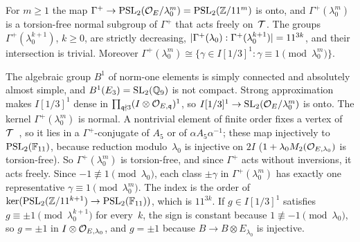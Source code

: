 \begin{lemma}\label{lem:chain}
\notformalized
For $m\ge1$ the map $\Gamma^+\to\operatorname{PSL}_2(\mathcal{O}_E/\lambda_0^m)=\operatorname{PSL}_2(\mathbb{Z}/11^m)$ is onto, and $\Gamma^+(\lambda_0^m)$ is a
torsion-free normal subgroup of $\Gamma^+$ that acts freely on~$\mathcal{T}$. The groups $\Gamma^+(\lambda_0^{k+1})$,
$k\ge0$, are strictly decreasing, $\lvert \Gamma^+(\lambda_0):\Gamma^+(\lambda_0^{k+1}) \rvert=11^{3k}$, and their intersection is
trivial. Moreover $\Gamma^+(\lambda_0^m)\cong\{\gamma\in I[1/3]^1:\gamma\equiv1\pmod{\lambda_0^m}\}$.
\end{lemma}
\begin{informalproof}
The algebraic group $B^1$ of norm-one elements is simply connected and absolutely almost simple, and $B^1(E_3)=\operatorname{SL}_2(\mathbb{Q}_9)$
is not compact. Strong approximation~\cite[Section~7.4]{PlatonovRapinchuk1994} makes $I[1/3]^1$ dense in
$\prod_{\mathfrak q\nmid3}(I\otimes\mathcal{O}_{E,\mathfrak q})^1$, so $I[1/3]^1\to\operatorname{SL}_2(\mathcal{O}_E/\lambda_0^m)$ is onto. The kernel
$\Gamma^+(\lambda_0^m)$ is normal. A nontrivial element of finite order fixes a vertex of~$\mathcal{T}$~\cite[Section~I.4]{Serre1980},
so it lies in a $\Gamma^+$-conjugate of $A_5$ or of $\alpha A_5\alpha^{-1}$; these map injectively to
$\operatorname{PSL}_2(\mathbb{F}_{11})$, because reduction modulo~$\lambda_0$ is injective on $2I$ ($1+\lambda_0M_2(\mathcal{O}_{E,\lambda_0})$ is
torsion-free). So $\Gamma^+(\lambda_0^m)$ is torsion-free, and since $\Gamma^+$ acts without inversions, it acts freely.
Since $-1\not\equiv1\pmod{\lambda_0}$, each class $\pm\gamma$ in $\Gamma^+(\lambda_0^m)$ has exactly one representative
$\gamma\equiv1\pmod{\lambda_0^m}$. The index is the order of $\ker(\operatorname{PSL}_2(\mathbb{Z}/11^{k+1})\to\operatorname{PSL}_2(\mathbb{F}_{11}))$, which is
$11^{3k}$. If $g\in I[1/3]^1$ satisfies $g\equiv\pm1\pmod{\lambda_0^{k+1}}$ for every~$k$, the sign is constant because
$1\not\equiv-1\pmod{\lambda_0}$, so $g=\pm1$ in $I\otimes\mathcal{O}_{E,\lambda_0}$, and $g=\pm1$ because $B\to B\otimes E_{\lambda_0}$ is
injective.
\end{informalproof}


